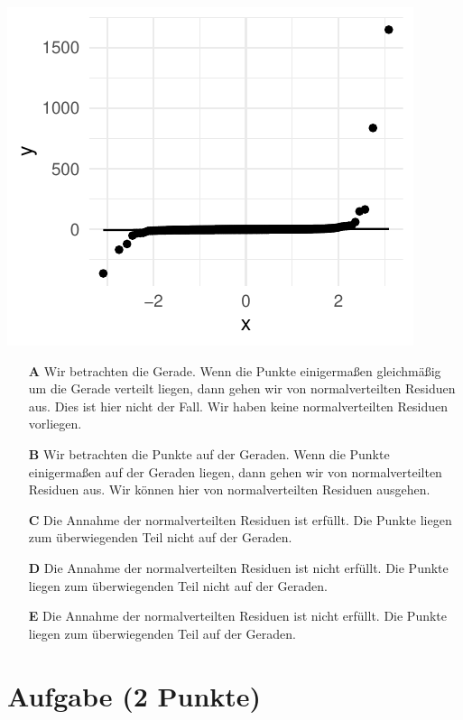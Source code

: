\documentclass[a4paper, 9pt]{scrartcl}\usepackage[]{graphicx}\usepackage[]{xcolor}
\makeatletter
\def\maxwidth{ %
  \ifdim\Gin@nat@width>\linewidth
    \linewidth
  \else
    \Gin@nat@width
  \fi
}
\makeatother
\begin{document}
{\centering \includegraphics[width=\maxwidth]{img/mc-regression-05-a-1} 

}







\begin{enumerate}
\item [\textbf{A} \msquare] Wir betrachten die Gerade. Wenn die Punkte einigermaßen gleichmäßig um die Gerade verteilt liegen, dann gehen wir von normalverteilten Residuen aus. Dies ist hier nicht der Fall. Wir haben keine normalverteilten Residuen vorliegen.
\item [\textbf{B} \msquare] Wir betrachten die Punkte auf der Geraden. Wenn die Punkte einigermaßen auf der Geraden liegen, dann gehen wir von normalverteilten Residuen aus. Wir können hier von normalverteilten Residuen ausgehen.
\item [\textbf{C} \msquare] Die Annahme der normalverteilten Residuen ist erfüllt. Die Punkte liegen zum überwiegenden Teil nicht auf der Geraden.
\item [\textbf{D} \msquare] Die Annahme der normalverteilten Residuen ist nicht erfüllt. Die Punkte liegen zum überwiegenden Teil nicht auf der Geraden.
\item [\textbf{E} \msquare] Die Annahme der normalverteilten Residuen ist nicht erfüllt. Die Punkte liegen zum überwiegenden Teil auf der Geraden.
\end{enumerate}

\section{Aufgabe \hfill (2 Punkte)}
\end{document}
